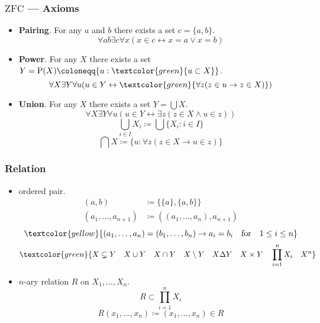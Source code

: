 \documentclass[UTF8,11pt,colorlinks,compress,openany]{beamer}%
\begin{document}
\begin{frame}\frametitle{$\mathrm{ZFC}$ --- Axioms}
	\begin{itemize}
		\item \textbf{Pairing}. For any $a$ and $b$ there exists a set $c=\{a,b\}$.
		\[\forall ab\exists c\forall x(x\in c\leftrightarrow x=a\vee x=b)\]
		\item \textbf{Power}. For any $X$ there exists a set $Y=\operatorname{P}(X)\coloneqq \{u: \textcolor{green}{u\subset X}\}$.
		\[\forall X\exists Y\forall u(u\in Y\leftrightarrow\textcolor{green}{\forall z(z\in u\to z\in X)})\]
		\item \textbf{Union}. For any $X$ there exists a set $Y=\bigcup X$.
		\[\forall X\exists Y\forall u(u\in Y\leftrightarrow\exists z(z\in X\wedge u\in z))\]
		\[\bigcup\limits_{i\in I}X_i\coloneqq \bigcup\{X_i: i\in I\}\]
		\[\bigcap X\coloneqq \{u: \forall z(z\in X\to u\in z)\}\]
	\end{itemize}
\end{frame}

\begin{frame}\frametitle{Relation}
	\begin{itemize}
		\item ordered pair.
		\begin{align*}
		(a,b)&\coloneqq \{\{a\},\{a,b\}\}\\
		(a_1,\dots,a_{n+1})&\coloneqq ((a_1,\dots,a_n),a_{n+1})
		\end{align*}
		\[\textcolor{yellow}{(a_1,\dots,a_n)=(b_1,\dots,b_n)\to a_i=b_i\quad\text{for}\quad 1\leq i\leq n}\]
		\[\textcolor{green}{X\subsetneq Y\quad X\cup Y\quad X\cap Y\quad X\setminus Y\quad X\Delta Y\quad X\times Y\quad\prod\limits_{i=1}^n X_i\quad X^n}\]
		\item $n$-ary relation $R$ on $X_1,\dots,X_n$. \[R\subset\prod\limits_{i=1}^n X_i\]
		\[R(x_1,\dots,x_n)\coloneqq (x_1,\dots,x_n)\in R\]
	\end{itemize}
\end{frame}
\end{document}
